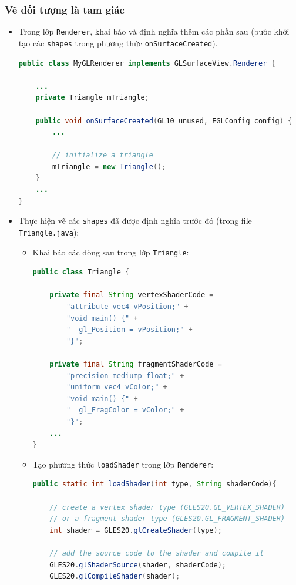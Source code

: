 \documentclass[13pt,a4paper]{extreport}
\begin{document}
\subsubsection{Vẽ đối tượng là tam giác}
	\begin{itemize}
		\item Trong lớp \verb|Renderer|, khai báo và định nghĩa thêm các phần sau (bước khởi tạo các \verb|shapes| trong phương thức \verb|onSurfaceCreated|).
			\begin{lstlisting}[language=Java]
public class MyGLRenderer implements GLSurfaceView.Renderer {

    ...
    private Triangle mTriangle;

    public void onSurfaceCreated(GL10 unused, EGLConfig config) {
        ...

        // initialize a triangle
        mTriangle = new Triangle();        
    }
    ...
}
			\end{lstlisting}
		
		\item Thực hiện vẽ các \verb|shapes| đã được định nghĩa trước đó (trong file \verb|Triangle.java|):%
			\begin{itemize}
				\item Khai báo các dòng sau trong lớp \verb|Triangle|:
					\begin{lstlisting}[language=Java]
public class Triangle {

    private final String vertexShaderCode =
        "attribute vec4 vPosition;" +
        "void main() {" +
        "  gl_Position = vPosition;" +
        "}";

    private final String fragmentShaderCode =
        "precision mediump float;" +
        "uniform vec4 vColor;" +
        "void main() {" +
        "  gl_FragColor = vColor;" +
        "}";
    ...
}						
					\end{lstlisting}
				
				\item Tạo phương thức \verb|loadShader| trong lớp \verb|Renderer|:
					\begin{lstlisting}[language=Java]
public static int loadShader(int type, String shaderCode){

    // create a vertex shader type (GLES20.GL_VERTEX_SHADER)
    // or a fragment shader type (GLES20.GL_FRAGMENT_SHADER)
    int shader = GLES20.glCreateShader(type);

    // add the source code to the shader and compile it
    GLES20.glShaderSource(shader, shaderCode);
    GLES20.glCompileShader(shader);


\end{lstlisting}
\end{itemize}
\end{itemize}
\end{document}
